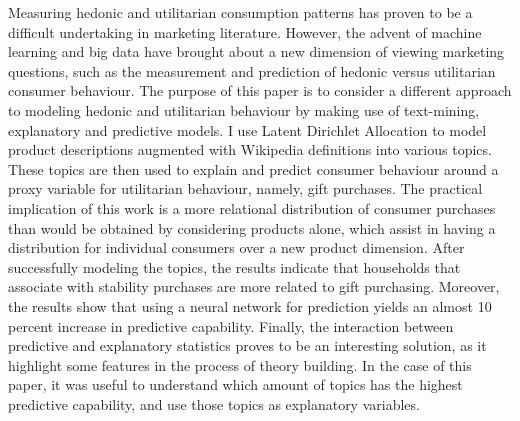 
Measuring hedonic and utilitarian consumption patterns has proven to be a difficult undertaking in marketing literature. However, the advent of machine learning and big data have brought about a new dimension of viewing marketing questions, such as the measurement and prediction of hedonic versus utilitarian consumer behaviour. The purpose of this paper is to consider a different approach to modeling hedonic and utilitarian behaviour by making use of text-mining, explanatory and predictive models. I use Latent Dirichlet Allocation to model product descriptions augmented with Wikipedia definitions into various topics. These topics are then used to explain and predict consumer behaviour around a proxy variable for utilitarian behaviour, namely, gift purchases. The practical implication of this work is a more relational distribution of consumer purchases than would be obtained by considering products alone, which assist in having a distribution for individual consumers over a new product dimension. After successfully modeling the topics, the results indicate that households that associate with stability purchases are more related to gift purchasing. Moreover, the results show that using a neural network for prediction yields an almost 10 percent increase in predictive capability. Finally, the interaction between predictive and explanatory statistics proves to be an interesting solution, as it highlight some features in the process of theory building. In the case of this paper, it was useful to understand which amount of topics has the highest predictive capability, and use those topics as explanatory variables.




